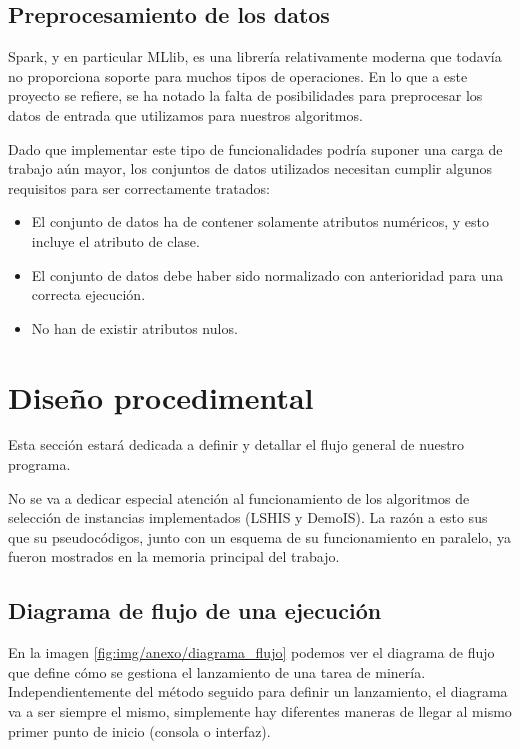 \subsection{Preprocesamiento de los datos}

Spark, y en particular MLlib, es una librería relativamente moderna que todavía no proporciona soporte para muchos tipos de operaciones. En lo que a este proyecto se refiere, se ha notado la falta de posibilidades para preprocesar los datos de entrada que utilizamos para nuestros algoritmos.

Dado que implementar este tipo de funcionalidades podría suponer una carga de trabajo aún mayor, los conjuntos de datos utilizados necesitan cumplir algunos requisitos para ser correctamente tratados:

\begin{itemize}
\item El conjunto de datos ha de contener solamente atributos numéricos, y esto incluye el atributo de clase.
\item El conjunto de datos debe haber sido normalizado con anterioridad para una correcta ejecución.
\item No han de existir atributos nulos.
\end{itemize}

\section{Diseño procedimental}

Esta sección estará dedicada a definir y detallar el flujo general de nuestro programa.

No se va a dedicar especial atención al funcionamiento de los algoritmos de selección de instancias implementados (LSHIS y DemoIS). La razón a esto sus que su pseudocódigos, junto con un esquema de su funcionamiento en paralelo, ya fueron mostrados en la memoria principal del trabajo.

\subsection{Diagrama de flujo de una ejecución}

En la imagen \ref{fig:img/anexo/diagrama_flujo} podemos ver el diagrama de flujo que define cómo se gestiona el lanzamiento de una tarea de minería. Independientemente del método seguido para definir un lanzamiento, el diagrama va a ser siempre el mismo, simplemente hay diferentes maneras de llegar al mismo primer punto de inicio (consola o interfaz).

